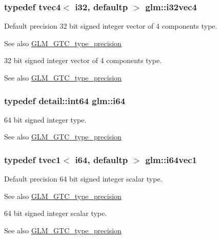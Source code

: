 \subsubsection[{i32vec4}]{\setlength{\rightskip}{0pt plus 5cm}typedef tvec4$<$ i32, defaultp $>$ {\bf glm\+::i32vec4}}\label{group__gtc__type__precision_ga3ada3676600db65a425058c0a150d83e}
Default precision 32 bit signed integer vector of 4 components type. \begin{DoxySeeAlso}{See also}
\hyperlink{group__gtc__type__precision}{G\+L\+M\+\_\+\+G\+T\+C\+\_\+type\+\_\+precision}
\end{DoxySeeAlso}
32 bit signed integer vector of 4 components type. \begin{DoxySeeAlso}{See also}
\hyperlink{group__gtc__type__precision}{G\+L\+M\+\_\+\+G\+T\+C\+\_\+type\+\_\+precision} 
\end{DoxySeeAlso}
\hypertarget{group__gtc__type__precision_gac7a7eaad46064fc952b06df33689da23}{}
\subsubsection[{i64}]{\setlength{\rightskip}{0pt plus 5cm}typedef detail\+::int64 {\bf glm\+::i64}}\label{group__gtc__type__precision_gac7a7eaad46064fc952b06df33689da23}
64 bit signed integer type. \begin{DoxySeeAlso}{See also}
\hyperlink{group__gtc__type__precision}{G\+L\+M\+\_\+\+G\+T\+C\+\_\+type\+\_\+precision} 
\end{DoxySeeAlso}
\hypertarget{group__gtc__type__precision_ga7ee2c91a98ebd719ae26e15ad89106de}{}
\subsubsection[{i64vec1}]{\setlength{\rightskip}{0pt plus 5cm}typedef tvec1$<$ i64, defaultp $>$ {\bf glm\+::i64vec1}}\label{group__gtc__type__precision_ga7ee2c91a98ebd719ae26e15ad89106de}
Default precision 64 bit signed integer scalar type. \begin{DoxySeeAlso}{See also}
\hyperlink{group__gtc__type__precision}{G\+L\+M\+\_\+\+G\+T\+C\+\_\+type\+\_\+precision}
\end{DoxySeeAlso}
64 bit signed integer scalar type. \begin{DoxySeeAlso}{See also}
\hyperlink{group__gtc__type__precision}{G\+L\+M\+\_\+\+G\+T\+C\+\_\+type\+\_\+precision} 
\end{DoxySeeAlso}
\hypertarget{group__gtc__type__precision_ga5a03cb457be28a9a8b9e61163fe648a1}{}

